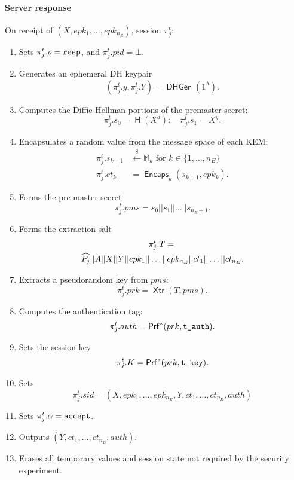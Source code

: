 \documentclass[USenglish,oneside,twocolumn]{article}
\theoremstyle{dgthm}
\theoremstyle{dgdef}
\newcommand{\con}{||}
\newcommand{\samples}{\xleftarrow{\$}}
\newcommand{\AlgorithmName}[1]{\operatorname{\mathsf{#1}}}
\newcommand{\Hash}{\AlgorithmName{H}}
\newcommand{\Encaps}{\AlgorithmName{Encaps}}
\newcommand{\dhgen}{\AlgorithmName{DHGen}}
\newcommand{\PRF}{\AlgorithmName{Prf}}
\newcommand{\XTR}{\AlgorithmName{Xtr}}
\newcommand{\p}[2]{\pi_{#1}^{#2}}
\newcommand{\Token}[1]{\textnormal{\tt{#1}}}
\newcommand{\resp}{\Token{resp}}
\newcommand{\accept}{\Token{accept}}
\begin{document}
  \paragraph*{Server response}
  On receipt of $(X, epk_1, \dots, epk_{n_E})$, session $\p{j}{t}$:
  \begin{enumerate}
    \item Sets $\p{j}{t}.\rho = \resp$, and $\p{j}{t}.pid = \bot$.
    \item Generates an ephemeral DH keypair
      \[(\p{j}{t}.y,\p{j}{t}.Y) = \dhgen(1^\lambda).\]
    \item Computes the Diffie-Hellman portions of the premaster secret:
      \[\p{j}{t}.s_0 = \Hash(X^a); \quad \p{j}{t}.s_1 = X^y.\]
    \item Encapsulates a random value from the message space of each KEM:
      \begin{align*}
      \p{j}{t}.s_{k+1} &\samples \mathbb{M}_k \text{~for $k \in \{1, \dots, n_E\}$}\\
      \p{j}{t}.ct_{k} &= \Encaps_k(s_{k+1}, epk_k).
      \end{align*}
    \item Forms the pre-master secret
      \[\p{j}{t}.pms = s_0\con s_1\con \dots \con s_{n_E + 1}.\]
    \item Forms the extraction salt
      \begin{multline}
        \p{j}{t}.T = {}\\
        \widehat{P_j} \con A \con X \con Y \con epk_1\con \dots \con epk_{n_E} \con ct_1 \con \dots \con ct_{n_E}.\notag
      \end{multline}
    \item Extracts a pseudorandom key from $pms$:\label{line:pjtxtr}
      \[\p{j}{t}.prk = \XTR(T, pms).\]
    \item Computes the authentication tag:\label{line:pjtprf}
      \[\p{j}{t}.auth = \PRF^*(prk, \Token{t\_auth}).\]
    \item Sets the session key\label{line:pjtK}
      \[\p{j}{t}.K = \PRF^*(prk, \Token{t\_key}).\]
    \item Sets \[\p{j}{t}.sid = (X, epk_1, \dots, epk_{n_E}, Y, ct_1, \dots, ct_{n_E}, auth)\]
    \item Sets $\p{j}{t}.\alpha = \accept$.
    \item Outputs $(Y, ct_1, \dots, ct_{n_E}, auth)$.
    \item Erases all temporary values and session state not required by the security experiment.
  \end{enumerate}
\end{document}
